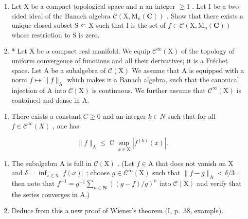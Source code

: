 \begin{enumerate}
\def\labelenumi{\arabic{enumi})}
\setcounter{enumi}{27}
\item
  Let X be a compact topological space and n an integer \(\geqslant 1\) . Let I be a two-sided ideal of the Banach algebra \(\mathcal{C}(\mathrm{X},\mathrm{M}_{n}(\mathbf{C}))\) . Show that there exists a unique closed subset S ⊂ X such that I is the set of \(f \in \mathcal{C}(\mathrm{X}, \mathrm{M}_{n}(\mathbf{C}))\) whose restriction to S is zero.
\item
  * Let X be a compact real manifold. We equip \(\mathcal{C}^{\infty}(\mathrm{X})\) of the topology of uniform convergence of functions and all their derivatives; it is a Fréchet space. Let A be a subalgebra of \(\mathcal{C}(\mathrm{X})\) We assume that A is equipped with a norm \(f \mapsto \| f\|_{\mathrm{A}}\) which makes it a Banach algebra, such that the canonical injection of A into \(\mathcal{C}(\mathrm{X})\) is continuous. We further assume that \(\mathcal{C}^{\infty}(\mathrm{X})\) is contained and dense in A.
\end{enumerate}

\begin{enumerate}
\def\labelenumi{\alph{enumi})}
\tightlist
\item
  There exists a constant \(C \geqslant 0\) and an integer \(k \in N\) such that for all \(f \in \mathcal{C}^{\infty}(X)\) , one has
\end{enumerate}

\[
\| f \| _ {\mathrm{A}} \leqslant \operatorname * {C} \sup _ {x \in \mathrm{X}} | f ^ {(k)} (x) |.
\]

\begin{enumerate}
\def\labelenumi{\alph{enumi})}
\setcounter{enumi}{1}
\item
  The subalgebra A is full in \(\mathcal{C}(\mathrm{X})\) . (Let \(f \in \mathrm{A}\) that does not vanish on X and \(\delta = \inf_{x \in \mathrm{X}} |f(x)|\) ; choose \(g \in \mathcal{C}^{\infty}(\mathrm{X})\) such that \(\|f - g\|_{\mathrm{A}} < \delta/3\) , then note that \(f^{-1} = g^{-1} \sum_{n \in \mathbf{N}} ((g - f)/g)^{n}\) into \(\mathcal{C}(\mathrm{X})\) and verify that the series converges in A.)
\item
  Deduce from this a new proof of Wiener's theorem (I, p.~38, example).
\end{enumerate}

